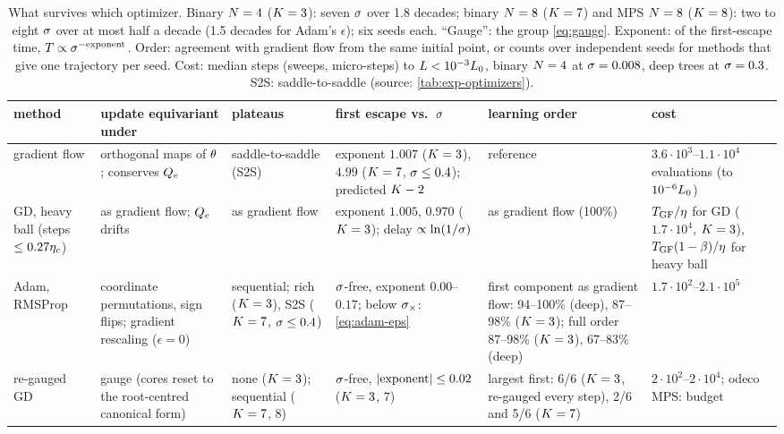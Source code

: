 \begin{table}[tbp]
  \centering
  \caption{What survives which optimizer. Binary $N=4$ ($K=3$): seven $\sigma$ over 1.8 decades; binary $N=8$
    ($K=7$) and MPS $N=8$ ($K=8$): two to eight $\sigma$ over at most half a decade (1.5 decades for Adam's
    $\epsilon$); six seeds each. ``Gauge'': the group \eqref{eq:gauge}. Exponent: of the first-escape time,
    $T\propto\sigma^{-\text{exponent}}$. Order: agreement with gradient flow from the same initial point, or counts over
    independent seeds for methods that give one trajectory per seed. Cost: median steps (sweeps, micro-steps) to
    $L<10^{-3}L_0$, binary $N=4$ at $\sigma=0.008$, deep trees at $\sigma=0.3$. S2S: saddle-to-saddle (source:
    \cref{tab:exp-optimizers}).}
  \label{tab:optimizers}
  \footnotesize
  \begin{tabularx}{\textwidth}{@{}>{\raggedright\arraybackslash}p{1.7cm}
      *{5}{>{\raggedright\arraybackslash}X}@{}}
    \toprule
    method & update equivariant under & plateaus & first escape vs.\ $\sigma$ & learning order & cost \\
    \midrule
    gradient flow & orthogonal maps of $\theta$; conserves $Q_{e}$ & saddle-to-saddle (S2S) &
      exponent $1.007$ ($K=3$), $4.99$ ($K=7$, $\sigma\le0.4$); predicted $K-2$ & reference &
      $3.6\cdot10^3$--$1.1\cdot10^4$ evaluations (to $10^{-6}L_0$) \\
    GD, heavy ball (steps $\le0.27\eta_c$) & as gradient flow; $Q_{e}$ drifts & as gradient flow &
      exponent $1.005$, $0.970$ ($K=3$); delay $\propto\ln(1/\sigma)$ & as gradient flow (100\%) &
      $T_{\rm GF}/\eta$ for GD ($1.7\cdot10^4$, $K=3$), $T_{\rm GF}(1-\beta)/\eta$ for heavy ball \\
    Adam, RMSProp & coordinate permutations, sign flips; gradient rescaling ($\epsilon=0$) &
      sequential; rich ($K=3$), S2S ($K=7$, $\sigma\le0.4$) & $\sigma$-free, exponent $0.00$--$0.17$; below
      $\sigma_\times$: \eqref{eq:adam-eps} & first component as gradient flow: 94--100\% (deep), 87--98\%
      ($K=3$); full order 87--98\% ($K=3$), 67--83\% (deep) & $1.7\cdot10^2$--$2.1\cdot10^5$ \\
    re-gauged GD & gauge (cores reset to the root-centred canonical form) & none ($K=3$); sequential ($K=7$,
      8) & $\sigma$-free, $\lvert\text{exponent}\rvert\le0.02$ ($K=3$, $7$) & largest first: 6/6 ($K=3$, re-gauged every
      step), 2/6 and 5/6 ($K=7$) & $2\cdot10^2$--$2\cdot10^4$; odeco MPS: budget \\

\end{tabularx}
\end{table}
